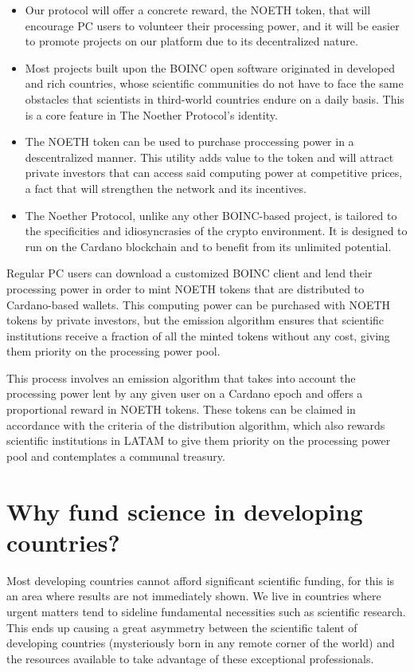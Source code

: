 \documentclass[11pt]{amsart}
\numberwithin{equation}{section}
\theoremstyle{definition}
\theoremstyle{remark}
\renewcommand{\_}[1]{_{\left( #1 \right)}}
\renewcommand{\^}[1]{^{\left( #1 \right)}}
\begin{document}
\begin{itemize}
\item Our protocol will offer a concrete reward, the NOETH token, that will encourage PC users to volunteer their processing power, and it will be easier to promote projects on our platform due to its decentralized nature.
	
\item Most projects built upon the BOINC open software originated in developed and rich countries, whose scientific communities do not have to face the same obstacles that scientists in third-world countries endure on a daily basis. This is a core feature in The Noether Protocol's identity.

\item The NOETH token can be used to purchase proccessing power in a descentralized manner. This utility adds value to the token and will attract private investors that can access said computing power at competitive prices, a fact that will strengthen the network and its incentives.

\item  The Noether Protocol, unlike any other BOINC-based project, is tailored to the specificities and idiosyncrasies of the crypto environment. It is designed to run on the Cardano blockchain and to benefit from its unlimited potential.  
\end{itemize}
Regular PC users can download a customized BOINC client and lend their processing power in order to mint NOETH tokens that are distributed to Cardano-based wallets. This computing power can be purchased with NOETH tokens by private investors, but the emission algorithm ensures that scientific institutions receive a fraction of all the minted tokens without any cost, giving them priority on the processing power pool. 

This process involves an emission algorithm that takes into account the processing power lent by any given user on a Cardano epoch and offers a proportional reward in NOETH tokens. These tokens can be claimed in accordance with the criteria of the distribution algorithm, which also rewards scientific institutions in LATAM to give them priority on the processing power pool and contemplates a communal treasury.  

\section{Why fund science in developing countries?}
Most developing countries cannot afford significant scientific funding, for this is an area where results are not immediately shown. We live in countries where urgent matters tend to sideline fundamental necessities such as scientific research. This ends up causing a great asymmetry between the scientific talent of developing countries (mysteriously born in any remote corner of the world) and the resources available to take advantage of these exceptional professionals.
\end{document}
